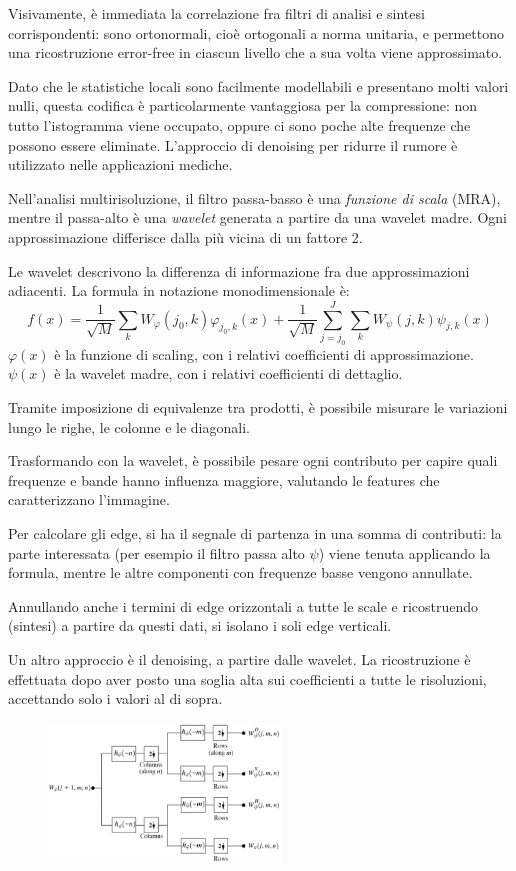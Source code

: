 Visivamente, è immediata la correlazione fra filtri di analisi e sintesi corrispondenti: sono ortonormali, cioè ortogonali a norma unitaria, e permettono una ricostruzione error-free in ciascun livello che a sua volta viene approssimato.

Dato che le statistiche locali sono facilmente modellabili e presentano molti valori nulli, questa codifica è particolarmente vantaggiosa per la compressione: non tutto l'istogramma viene occupato, oppure ci sono poche alte frequenze che possono essere eliminate. L'approccio di denoising per ridurre il rumore è utilizzato nelle applicazioni mediche.

Nell'analisi multirisoluzione, il filtro passa-basso è una \textit{funzione di scala} (MRA), mentre il passa-alto è una \textit{wavelet} generata a partire da una wavelet madre. Ogni approssimazione differisce dalla più vicina di un fattore 2.

Le wavelet descrivono la differenza di informazione fra due approssimazioni adiacenti. La formula in notazione monodimensionale è:
$$f(x)  = \frac{1}{\sqrt{M}} \sum_{k} W_\varphi (j_0, k) \varphi_{j_0, k} (x) + \frac{1}{\sqrt{M}} \sum_{j=j_0}^{J}\sum_{k} W_\psi(j, k)\psi_{j, k}(x)$$
$\varphi(x)$ è la funzione di scaling, con i relativi coefficienti di approssimazione. $\psi(x)$ è la wavelet madre, con i relativi coefficienti di dettaglio.

Tramite imposizione di equivalenze tra prodotti, è possibile misurare le variazioni lungo le righe, le colonne e le diagonali. 

Trasformando con la wavelet, è possibile pesare ogni contributo per capire quali frequenze e bande hanno influenza maggiore, valutando le features che caratterizzano l'immagine. 

Per calcolare gli edge, si ha il segnale di partenza in una somma di contributi: la parte interessata (per esempio il filtro passa alto $\psi$) viene tenuta applicando la formula, mentre le altre componenti con frequenze basse vengono annullate. 

Annullando anche i termini di edge orizzontali a tutte le scale e ricostruendo (sintesi) a partire da questi dati, si isolano i soli edge verticali.

Un altro approccio è il denoising, a partire dalle wavelet. La ricostruzione è effettuata dopo aver posto una soglia alta sui coefficienti a tutte le risoluzioni, accettando solo i valori al di sopra. 

 \begin{figure}
	\vspace{-5pt}
	\includegraphics[width=0.55\textwidth]{Lezioni/Immagini/wct2}
	\vspace{-50pt}
\end{figure}

